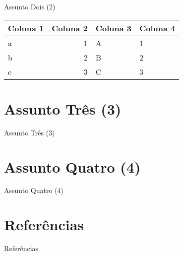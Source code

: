 \documentclass{beamer}
\begin{document}
    \begin{frame}{Assunto Dois (2)}
      \begin{table}[h]
        \centering
        \scriptsize
        \begin{tabular}{|l|r|l|l|}
          \hline
          \textbf{Coluna 1}  & \textbf{Coluna 2} & \textbf{Coluna 3} & \textbf{Coluna 4}  \\ \hline
          a                  & 1                 & A                 & 1                  \\ \hline
          b                  & 2                 & B                 & 2                  \\ \hline
          c                  & 3                 & C                 & 3                  \\ \hline
        \end{tabular}
        \label{tab:buscas}
      \end{table}
    \end{frame}

  \section{Assunto Três (3)}\label{sec:tres}

    \begin{frame}{Assunto Três (3)}
    \end{frame}

  \section{Assunto Quatro (4)}\label{sec:quatro}

    \begin{frame}{Assunto Quatro (4)}
    \end{frame}

  \section{Referências}\label{sec:referencias}

    \begin{frame}{Referências}
      \begingroup
        \scriptsize
        
        
      \endgroup
    \end{frame}

  \begin{frame}
    \titlepage
  \end{frame}
\end{document}
